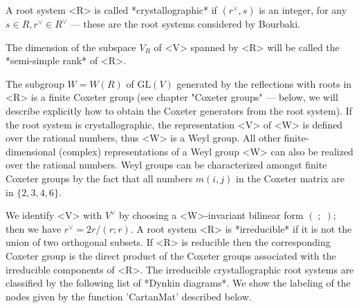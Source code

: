 A  root  system  <R>  is  called  *crystallographic*  if $(r^\vee,s)$ is an
integer,  for any $s\in R,r^\vee\in R^\vee$  --- these are the root systems
considered by Bourbaki.

The dimension of the subspace $V_R$ of <V> spanned by <R> will be called
the *semi-simple rank* of <R>.

The  subgroup $W=W(R)$ of $\mbox{GL}(V)$  generated by the reflections with
roots  in <R> is a  finite Coxeter group (see  chapter "Coxeter groups" ---
below,  we will  describe explicitly  how to  obtain the Coxeter generators
from  the  root  system).  If  the  root  system  is  crystallographic, the
representation <V> of <W> is defined over the rational numbers, thus <W> is
a  Weyl group. All other  finite-dimensional (complex) representations of a
Weyl  group <W> can also be realized over the rational numbers. Weyl groups
can  be characterized  amongst finite  Coxeter groups  by the fact that all
numbers $m(i,j)$ in the Coxeter matrix are in $\{2,3,4,6\}$.

We  identify <V>  with $V^\vee$  by choosing  a <W>-invariant bilinear form
$(\;;\;)$;   then  we  have   $r^\vee=2r/(r;r)$.  A  root   system  <R>  is
*irreducible*  if it is not the union  of two orthogonal subsets. If <R> is
reducible then the corresponding Coxeter group is the direct product of the
Coxeter  groups  associated  with  the  irreducible  components of <R>. The
irreducible  crystallographic root systems are  classified by the following
list  of *Dynkin diagrams*. We show the  labeling of the nodes given by the
function 'CartanMat' described below.

